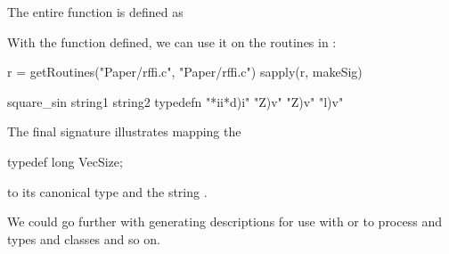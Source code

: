 The entire  function is defined as

With the function defined, we can use it on
the routines in  :
\begin{RCode}
r = getRoutines("Paper/rffi.c", "Paper/rffi.c")
sapply(r, makeSig)
\end{RCode}
\begin{ROutput}
square_sin    string1    string2   typedefn 
 "*ii*d)i"      "Z)v"      "Z)v"      "l)v" 
\end{ROutput}
The final signature illustrates mapping the
\begin{CCode}
typedef long VecSize;
\end{CCode}
to its canonical type and the  string .


We could go further with generating descriptions for use with
 or  to process  and
 types and \Cpp{} classes and so on.

